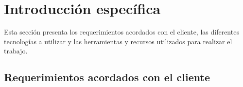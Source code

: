 \chapter{Introducción específica} %

\label{Chapter2}

Esta sección presenta los requerimientos acordados con el cliente, las diferentes tecnologías a utilizar y las herramientas y recursos utilizados para realizar el trabajo.

\section{Requerimientos acordados con el cliente}
